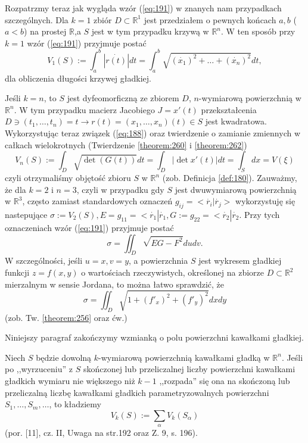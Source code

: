 \documentclass[leqno]{article}
\begin{document}
\begin{justify}
Rozpatrzmy teraz jak wygląda wzór (\ref{eq:191}) w znanych nam przypadkach szczególnych. Dla $k = 1$ zbiór $D \subset \mathbb{R}^1$ jest 
przedziałem o pewnych końcach $a, b$ ($a < b$) na prostej $\mathbb{R}$,a $S$ jest w tym przypadku krzywą w $\mathbb{R}^n$. W ten sposób przy $k = 1$ wzór (\ref{eq:191})
przyjmuje postać 
\[
    V_1(S) := \int_{a}^{b}|\dot{r(t)}|dt = \int_{a}^{b}\sqrt{{(\dot{x_1})}^2 + \ldots + {(\dot{x_n})}^2}dt,
\]
dla obliczenia długości krzywej gładkiej.

Jeśli $k = n$, to $S$ jest dyfeomorficzną ze zbiorem $D$, $n$-wymiarową powierzchnią w $\mathbb{R}^n$. W tym przypadku macierz Jacobiego $J = x'(t)$ przekształcenia 
$D \ni (t_1, \ldots, t_n) = t \to r(t) = (x_1, \ldots, x_n)(t) \in S$ jest kwadratowa. Wykorzystując teraz związek (\ref{eq:188}) oraz twierdzenie o zamianie zmiennych
w całkach wielokrotnych (Twierdzenie \ref{theorem:260} i \ref{theorem:262})
\[
    V_n(S) := \int_D \sqrt{ \det(G(t))}dt = \int_D |\det x'(t)| dt = \int_S dx = V(\xi)
\]
czyli otrzymaliśmy objętość zbioru $S$ w $\mathbb{R}^n$ (zob. Definicja \ref{def:180}).
Zauważmy, że dla $k = 2$ i $n = 3$, czyli w przypadku gdy $S$ jest dwuwymiarową powierzchnią w $\mathbb{R}^3$, często zamiast standardowych oznaczeń $g_{ij} = <\dot{r_i}|\dot{r_j}>$
wykorzystuję się nastepujące $\sigma := V_2(S), E = g_11 = <\dot{r_1}|\dot{r_1}, G := g_22 = <\dot{r_2}|\dot{r_2}$.
Przy tych oznaczeniach wzór (\ref{eq:191}) przyjmuje postać 
\[
    \sigma = \iint_D \sqrt{EG - F^2}dudv.
\]
W szczególności, jeśli $u = x, v = y$, a powierzchnia $S$ jest wykresem gładkiej funkcji $z = f(x,y)$ o wartościach rzeczywistych, określonej na zbiorze $D \subset \mathbb{R}^2$
mierzalnym w sensie Jordana, to można łatwo sprawdzić, że 
\[
    \sigma = \iint_D \sqrt{1 + {(f'_x)}^2 + {(f'_y)}^2}dxdy
\]
(zob. Tw. \ref{theorem:256} oraz ćw.)

Niniejszy paragraf zakończymy wzmianką o polu powierzchni kawałkami gładkiej.

\begin{defn}
    Niech $S$ będzie dowolną $k$-wymiarową powierzchnią kawałkami gładką w $\mathbb{R}^n$. Jeśli po ,,wyrzuceniu'' z $S$ 
    skończonej lub przeliczalnej liczby powierzchni kawałkami gładkich wymiaru nie większego niż $k-1$ ,,rozpada'' się ona na 
    skończoną lub przeliczalną liczbę kawałkami gładkich parametryzowalnych powierzchni $S_1, \ldots, S_m, \ldots$, to kładziemy 
    \[
        V_k(S) := \sum_{\alpha}V_k(S_\alpha)
    \]
    (por. [11], cz. II, Uwaga na str.192 oraz Z. 9, s. 196).
\end{defn}


\end{justify}
\end{document}
